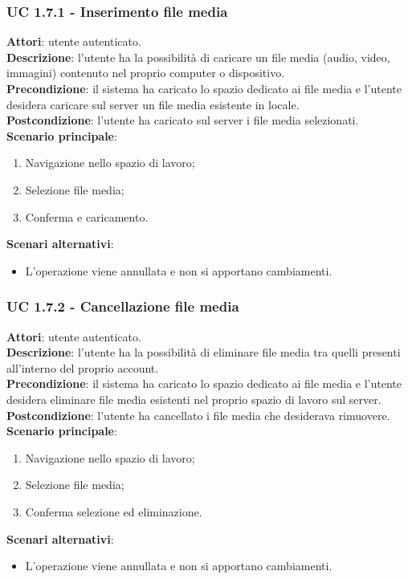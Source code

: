 \subsubsection{UC 1.7.1 - Inserimento file media}{
	\label{uc1.7.1}
	\textbf{Attori}: utente autenticato. \\
	\textbf{Descrizione}: l'utente ha la possibilità di caricare un file media (audio, video, immagini) contenuto nel proprio computer o dispositivo. \\
	\textbf{Precondizione}: il sistema ha caricato lo spazio dedicato ai file media e l'utente desidera caricare sul server un file media esistente in locale.	\\
	\textbf{Postcondizione}: l'utente ha caricato sul server i file media selezionati.	\\
	\textbf{Scenario principale}:
	\begin{enumerate}
		\item Navigazione nello spazio di lavoro;
		\item Selezione file media;
		\item Conferma e caricamento.
	\end{enumerate}
	\textbf{Scenari alternativi}: 
	\begin{itemize}
		\item L'operazione viene annullata e non si apportano cambiamenti.
	\end{itemize}
	}
	\subsubsection{UC 1.7.2 - Cancellazione file media}{
		\label{uc1.7.2}
		\textbf{Attori}: utente autenticato.	\\
		\textbf{Descrizione}: l'utente ha la possibilità di eliminare file media tra quelli presenti all'interno del proprio account. \\
		\textbf{Precondizione}: il sistema ha caricato lo spazio dedicato ai file media e l'utente desidera eliminare file media esistenti nel proprio spazio di lavoro sul server.	\\
		\textbf{Postcondizione}: l'utente ha cancellato i file media che desiderava rimuovere.	\\
		\textbf{Scenario principale}:
		\begin{enumerate}
			\item Navigazione nello spazio di lavoro;
			\item Selezione file media;
			\item Conferma selezione ed eliminazione.
		\end{enumerate}
		\textbf{Scenari alternativi}: 
		\begin{itemize}
			\item L'operazione viene annullata e non si apportano cambiamenti.
		\end{itemize}
		}
